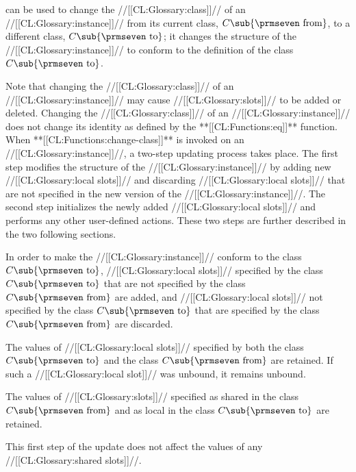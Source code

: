
                can be used to change the //[[CL:Glossary:class]]//  of an //[[CL:Glossary:instance]]// from its current class, $C\sub {\hbox{{\prmseven from}}}$, to a different class, $C\sub {\hbox{{\prmseven to}}}$; it changes the structure of the //[[CL:Glossary:instance]]// to conform to the definition of the class $C\sub {\hbox{{\prmseven to}}}$.

Note that changing the //[[CL:Glossary:class]]// of an //[[CL:Glossary:instance]]// may cause //[[CL:Glossary:slots]]// to be added or deleted.  Changing the //[[CL:Glossary:class]]// of an //[[CL:Glossary:instance]]// does not change its identity as defined by the **[[CL:Functions:eq]]** function.
       When **[[CL:Functions:change-class]]** is invoked on an //[[CL:Glossary:instance]]//, a two-step updating process takes place.  The first step modifies the structure of the //[[CL:Glossary:instance]]// by adding new //[[CL:Glossary:local slots]]// and discarding  //[[CL:Glossary:local slots]]// that are not specified in the new version of the //[[CL:Glossary:instance]]//. The second step initializes the newly added //[[CL:Glossary:local slots]]// and performs  any other user-defined actions. These two steps are further described in the  two following sections.


In order to make the //[[CL:Glossary:instance]]// conform to the class $C\sub {\hbox{{\prmseven to}}}$, //[[CL:Glossary:local slots]]// specified by the class $C\sub {\hbox{{\prmseven to}}}$ that are not specified by the class $C\sub {\hbox{{\prmseven from}}}$ are added, and //[[CL:Glossary:local slots]]// not specified by the class $C\sub {\hbox{{\prmseven to}}}$ that are specified by the class $C\sub {\hbox{{\prmseven from}}}$ are discarded.

The values of //[[CL:Glossary:local slots]]// specified by both the class $C\sub {\hbox{{\prmseven to}}}$ and the class $C\sub {\hbox{{\prmseven from}}}$ are retained. If such a //[[CL:Glossary:local slot]]// was unbound, it remains unbound.

The values of //[[CL:Glossary:slots]]// specified as shared in the class $C\sub {\hbox{{\prmseven from}}}$ and as local in the class $C\sub {\hbox{{\prmseven to}}}$ are retained.

This first step of the update does not affect the values of any  //[[CL:Glossary:shared slots]]//.

\endsubsection%

